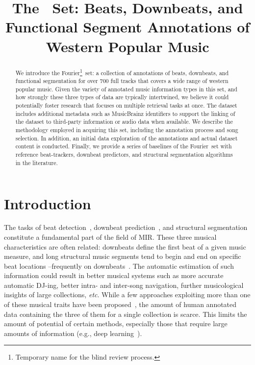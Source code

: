 \documentclass{article}
\title{The \setNameUpper~Set: Beats, Downbeats, and Functional Segment Annotations of Western Popular Music}
\newcommand{\setName}{Fourier}
\begin{document}
%
\maketitle
%
\begin{abstract}
    We introduce the \setName\footnote{Temporary name for the blind review process.}~set: a collection of annotations of beats, downbeats, and functional segmentation for over 700 full tracks that covers a wide range of western popular music.
    Given the variety of annotated music information types in this set, and how strongly these three types of data are typically intertwined, we believe it could potentially foster research that focuses on multiple retrieval tasks at once.
    The dataset includes additional metadata such as MusicBrainz identifiers to support the linking of the dataset to third-party information or audio data when available.
    We describe the methodology employed in acquiring this set, including the annotation process and song selection. 
    In addition, an initial data exploration of the annotations and actual dataset content is conducted. 
    Finally, we provide a series of baselines of the \setName~set with reference beat-trackers, downbeat predictors, and structural segmentation algorithms in the literature.
\end{abstract}
%
\section{Introduction}\label{sec:introduction}

The tasks of beat detection~\cite{Ellis2007}, downbeat prediction~\cite{Bock2016}, and structural segmentation~\cite{Paulus2010} constitute a fundamental part of the field of MIR.
These three musical characteristics are often related: downbeats define the first beat of a given music measure, and long structural music segments tend to begin and end on specific beat locations --frequently on downbeats~\cite{Foote1999}.
The automatic estimation of such information could result in better musical systems such as more accurate automatic DJ-ing, better intra- and inter-song navigation, further musicological insights of large collections, \emph{etc}.
While a few approaches exploiting more than one of these musical traits have been proposed~\cite{Bock2016, Mccallum2019, Fuentes2019}, the amount of human annotated data containing the three of them for a single collection is scarce.
This limits the amount of potential of certain methods, especially those that require large amounts of information (e.g., deep learning~\cite{Humphrey2012}).
\end{document}
